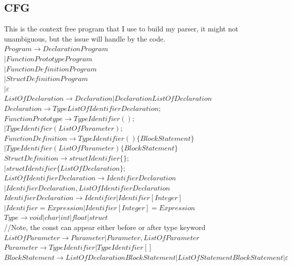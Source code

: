 \documentclass{article}
\begin{document}
    \subsection{CFG}
    This is the context free program that I use to build my parser, it might not unambiguous, but the issue will handle by the code.\\
    $Program \rightarrow Declaration Program $\\
    $| FunctionPrototype Program$\\
    $| FunctionDefinition Program$\\
    $| StructDefinition Program$\\
    $| \varepsilon$\\
    $ListOfDeclaration \rightarrow Declaration | Declaration ListOfDeclaration$\\
    $Declaration \rightarrow Type ListOfIdentifierDeclaration ;$\\
    $FunctionPrototype \rightarrow Type Identifier ( ) ;$\\
    $| Type Identifier ( ListOfParameter ) ;$\\
    $FunctionDefinition \rightarrow Type Identifier ( ) \{ BlockStatement \}$ \\
    $| Type Identifier ( ListOfParameter ) \{ BlockStatement \}$\\
    $StructDefinition \rightarrow struct Identifier \{ \} ;$\\
    $| struct Identifier \{ ListOfDeclaration \} ;$\\
    $ListOfIdentifierDeclaration \rightarrow IdentifierDeclaration $\\
    $| IdentifierDeclaration , ListOfIdentifierDeclaration$\\
    $IdentifierDeclaration \rightarrow Identifier | Identifier [ Integer ]$\\
    $| Identifier = Expression | Identifier [ Integer ] = Expression$\\
    $Type \rightarrow void | char | int | float | struct$ \\//Note, the const can appear either before or after type keyword\\
    $ListOfParameter \rightarrow Parameter | Parameter , ListOfParameter$\\
    $Parameter \rightarrow Type Identifier | Type Identifier [ ]$\\
    $BlockStatement \rightarrow ListOfDeclaration BlockStatement| ListOfStatement BlockStatement | \varepsilon$\\
\end{document}
